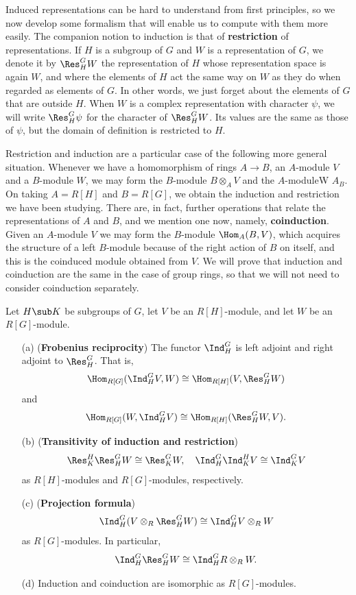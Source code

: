 Induced representations can be hard to understand from first principles, so we now develop some formalism that will enable us to compute with them more easily. The companion notion to induction is that of \textbf{restriction} of representations. If $H$ is a subgroup of $G$ and $W$ is a representation of $G$, we denote it by $\Res^G_HW$ the representation of $H$ whose representation space is again $W$, and where the elements of $H$ act the same way on $W$ as they do when regarded as elements of $G$. In other words, we just forget about the elements of $G$ that are outside $H$. When $W$ is a complex representation with character $\psi$, we will write $\Res^G_H\psi$ for the character of $\Res^G_HW$. Its values are the same as those of $\psi$, but the domain of definition is restricted to $H$.\par
Restriction and induction are a particular case of the following more general situation. Whenever we have a homomorphism of rings $A\to B$, an $A$-module $V$ and a $B$-module $W$, we may form the $B$-module $B\otimes_AV$ and the $A$-moduleW $A_B$. On taking $A=R[H]$ and $B=R[G]$, we obtain the induction and restriction we have been studying. There are, in fact, further operations that relate the representations of $A$ and $B$, and we mention one now, namely, \textbf{coinduction}. Given an $A$-module $V$ we may form the $B$-module $\Hom_A(B,V)$, which acquires the structure of a left $B$-module because of the right action of $B$ on itself, and this is the coinduced module obtained from $V$. We will prove that induction and coinduction are the same in the case of group rings, so that we will not need to consider coinduction separately.
\begin{proposition}\label{group ring base change prop}
Let $H\sub K$ be subgroups of $G$, let $V$ be an $R[H]$-module, and let $W$ be an $R[G]$-module.
\begin{itemize}
\item[(a)] (\textbf{Frobenius reciprocity}) The functor $\Ind^G_H$ is left adjoint and right adjoint to $\Res^G_H$. That is,
\[\Hom_{R[G]}(\Ind^G_HV,W)\cong\Hom_{R[H]}(V,\Res^G_HW)\]
and
\[\Hom_{R[G]}(W,\Ind^G_HV)\cong\Hom_{R[H]}(\Res^G_HW,V).\]
\item[(b)] (\textbf{Transitivity of induction and restriction})
\[\Res^H_K\Res^G_HW\cong\Res^G_KW,\quad \Ind^G_H\Ind^H_K V\cong\Ind^G_KV\]
as $R[H]$-modules and $R[G]$-modules, respectively.
\item[(c)] (\textbf{Projection formula})
\[\Ind^G_H(V\otimes_R\Res^G_HW)\cong\Ind^G_HV\otimes_RW\]
as $R[G]$-modules. In particular, 
\[\Ind^G_H\Res^G_HW\cong \Ind^G_HR\otimes_RW.\]
\item[(d)] Induction and coinduction are isomorphic as $R[G]$-modules.
\end{itemize}
\end{proposition}
